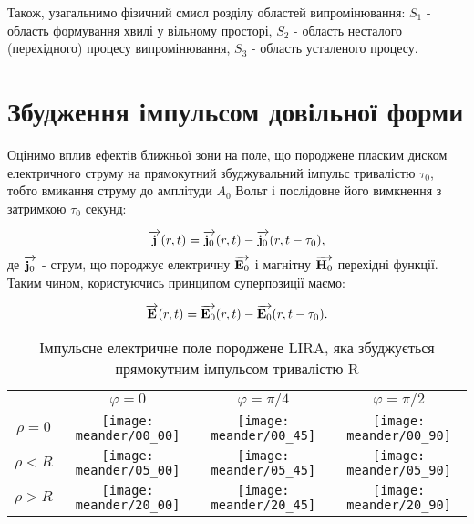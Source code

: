 Також, узагальнимо фізичний смисл розділу областей випромінювання: 
$ S_1 $ - область формування хвилі у вільному просторі, $ S_2 $ - область 
несталого (перехідного) процесу випромінювання, $ S_3 $ - область
усталеного процесу.

\section{Збудження імпульсом довільної форми}

Оцінимо вплив ефектів ближньої зони на поле, що породжене пласким диском 
електричного струму на прямокутний збуджувальний імпульс тривалістю 
$ \tau_0 $, тобто вмикання струму до амплітуди $ A_0 $ Вольт і послідовне 
його вимкнення з затримкою $ \tau_0 $ секунд:

\begin{equation}
\overrightarrow{\mathbf j} (r,t) = \overrightarrow{\mathbf j_0} (r,t) - \overrightarrow{\mathbf j_0} (r,t-\tau_0),
\end{equation}
%
де $ \overrightarrow{\mathbf j_0} $ - струм, що породжує електричну $ \overrightarrow{\mathbf E_0} $ і магнітну 
$ \overrightarrow{\mathbf H_0} $ перехідні функції. Таким чином, користуючись принципом 
суперпозиції маємо:

\begin{equation}
\overrightarrow{\mathbf E} (r,t) = \overrightarrow{\mathbf E_0} (r,t) - \overrightarrow{\mathbf E_0} (r,t-\tau_0).
\end{equation}

\begin{table}[ht]
\caption{Імпульсне електричне поле породжене LIRA, яка збуджується 
прямокутним імпульсом тривалістю R} \label{tab:meander_shape}
\centering
\begin{tabular}{cccc}

& $ \varphi = 0 $ & $ \varphi = \pi/4 $ & $ \varphi = \pi/2 $ \\

$ \rho = 0 $ &
\texttt{[image: meander/00\_00]} & 
\texttt{[image: meander/00\_45]} & 
\texttt{[image: meander/00\_90]} \\

$ \rho < R $ &
\texttt{[image: meander/05\_00]} & 
\texttt{[image: meander/05\_45]} & 
\texttt{[image: meander/05\_90]} \\

$ \rho > R $ &
\texttt{[image: meander/20\_00]} & 
\texttt{[image: meander/20\_45]} & 
\texttt{[image: meander/20\_90]} \\

\end{tabular}
\end{table}

